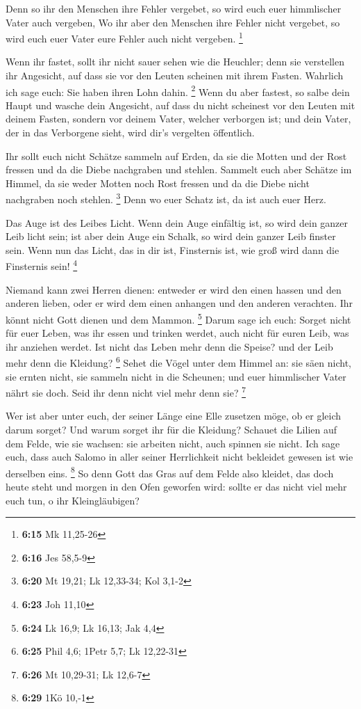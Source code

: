  Denn so ihr den Menschen ihre Fehler vergebet, so wird
euch euer himmlischer Vater auch vergeben,  Wo ihr aber den
Menschen ihre Fehler nicht vergebet, so wird euch euer Vater eure Fehler
auch nicht vergeben. \footnote{\textbf{6:15} Mk 11,25-26}

 Wenn ihr fastet, sollt ihr nicht sauer sehen wie die
Heuchler; denn sie verstellen ihr Angesicht, auf dass sie vor den Leuten
scheinen mit ihrem Fasten. Wahrlich ich sage euch: Sie haben ihren Lohn
dahin. \footnote{\textbf{6:16} Jes 58,5-9}  Wenn du aber
fastest, so salbe dein Haupt und wasche dein Angesicht, 
auf dass du nicht scheinest vor den Leuten mit deinem Fasten, sondern
vor deinem Vater, welcher verborgen ist; und dein Vater, der in das
Verborgene sieht, wird dir's vergelten öffentlich.

 Ihr sollt euch nicht Schätze sammeln auf Erden, da sie die
Motten und der Rost fressen und da die Diebe nachgraben und stehlen.
 Sammelt euch aber Schätze im Himmel, da sie weder Motten
noch Rost fressen und da die Diebe nicht nachgraben noch stehlen.
\footnote{\textbf{6:20} Mt 19,21; Lk 12,33-34; Kol 3,1-2} 
Denn wo euer Schatz ist, da ist auch euer Herz.

 Das Auge ist des Leibes Licht. Wenn dein Auge einfältig
ist, so wird dein ganzer Leib licht sein;  ist aber dein
Auge ein Schalk, so wird dein ganzer Leib finster sein. Wenn nun das
Licht, das in dir ist, Finsternis ist, wie groß wird dann die Finsternis
sein! \footnote{\textbf{6:23} Joh 11,10}

 Niemand kann zwei Herren dienen: entweder er wird den
einen hassen und den anderen lieben, oder er wird dem einen anhangen und
den anderen verachten. Ihr könnt nicht Gott dienen und dem Mammon.
\footnote{\textbf{6:24} Lk 16,9; Lk 16,13; Jak 4,4}  Darum
sage ich euch: Sorget nicht für euer Leben, was ihr essen und trinken
werdet, auch nicht für euren Leib, was ihr anziehen werdet. Ist nicht
das Leben mehr denn die Speise? und der Leib mehr denn die Kleidung?
\footnote{\textbf{6:25} Phil 4,6; 1Petr 5,7; Lk 12,22-31} 
Sehet die Vögel unter dem Himmel an: sie säen nicht, sie ernten nicht,
sie sammeln nicht in die Scheunen; und euer himmlischer Vater nährt sie
doch. Seid ihr denn nicht viel mehr denn sie? \footnote{\textbf{6:26} Mt
  10,29-31; Lk 12,6-7}

 Wer ist aber unter euch, der seiner Länge eine Elle
zusetzen möge, ob er gleich darum sorget?  Und warum sorget
ihr für die Kleidung? Schauet die Lilien auf dem Felde, wie sie wachsen:
sie arbeiten nicht, auch spinnen sie nicht.  Ich sage euch,
dass auch Salomo in aller seiner Herrlichkeit nicht bekleidet gewesen
ist wie derselben eins. \footnote{\textbf{6:29} 1Kö 10,-1} 
So denn Gott das Gras auf dem Felde also kleidet, das doch heute steht
und morgen in den Ofen geworfen wird: sollte er das nicht viel mehr euch
tun, o ihr Kleingläubigen?

